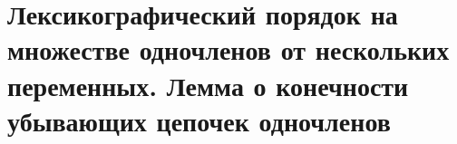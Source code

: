 \section{Лексикографический порядок на множестве одночленов от нескольких переменных. Лемма о конечности убывающих цепочек одночленов}